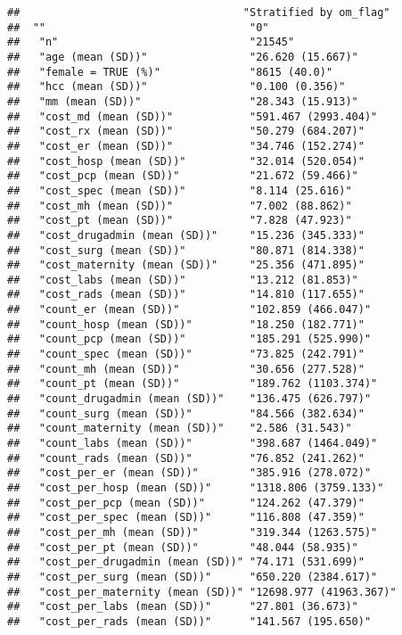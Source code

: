 \documentclass[]{article}
\begin{document}
\begin{verbatim}
##                                   "Stratified by om_flag"
##  ""                                "0"                    
##   "n"                              "21545"                
##   "age (mean (SD))"                "26.620 (15.667)"      
##   "female = TRUE (%)"              "8615 (40.0)"          
##   "hcc (mean (SD))"                "0.100 (0.356)"        
##   "mm (mean (SD))"                 "28.343 (15.913)"      
##   "cost_md (mean (SD))"            "591.467 (2993.404)"   
##   "cost_rx (mean (SD))"            "50.279 (684.207)"     
##   "cost_er (mean (SD))"            "34.746 (152.274)"     
##   "cost_hosp (mean (SD))"          "32.014 (520.054)"     
##   "cost_pcp (mean (SD))"           "21.672 (59.466)"      
##   "cost_spec (mean (SD))"          "8.114 (25.616)"       
##   "cost_mh (mean (SD))"            "7.002 (88.862)"       
##   "cost_pt (mean (SD))"            "7.828 (47.923)"       
##   "cost_drugadmin (mean (SD))"     "15.236 (345.333)"     
##   "cost_surg (mean (SD))"          "80.871 (814.338)"     
##   "cost_maternity (mean (SD))"     "25.356 (471.895)"     
##   "cost_labs (mean (SD))"          "13.212 (81.853)"      
##   "cost_rads (mean (SD))"          "14.810 (117.655)"     
##   "count_er (mean (SD))"           "102.859 (466.047)"    
##   "count_hosp (mean (SD))"         "18.250 (182.771)"     
##   "count_pcp (mean (SD))"          "185.291 (525.990)"    
##   "count_spec (mean (SD))"         "73.825 (242.791)"     
##   "count_mh (mean (SD))"           "30.656 (277.528)"     
##   "count_pt (mean (SD))"           "189.762 (1103.374)"   
##   "count_drugadmin (mean (SD))"    "136.475 (626.797)"    
##   "count_surg (mean (SD))"         "84.566 (382.634)"     
##   "count_maternity (mean (SD))"    "2.586 (31.543)"       
##   "count_labs (mean (SD))"         "398.687 (1464.049)"   
##   "count_rads (mean (SD))"         "76.852 (241.262)"     
##   "cost_per_er (mean (SD))"        "385.916 (278.072)"    
##   "cost_per_hosp (mean (SD))"      "1318.806 (3759.133)"  
##   "cost_per_pcp (mean (SD))"       "124.262 (47.379)"     
##   "cost_per_spec (mean (SD))"      "116.808 (47.359)"     
##   "cost_per_mh (mean (SD))"        "319.344 (1263.575)"   
##   "cost_per_pt (mean (SD))"        "48.044 (58.935)"      
##   "cost_per_drugadmin (mean (SD))" "74.171 (531.699)"     
##   "cost_per_surg (mean (SD))"      "650.220 (2384.617)"   
##   "cost_per_maternity (mean (SD))" "12698.977 (41963.367)"
##   "cost_per_labs (mean (SD))"      "27.801 (36.673)"      
##   "cost_per_rads (mean (SD))"      "141.567 (195.650)"    

\end{verbatim}
\end{document}

